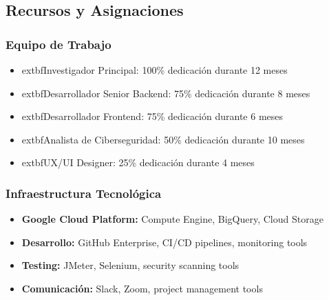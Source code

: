 \subsection{Recursos y Asignaciones}

\subsubsection{Equipo de Trabajo}

\begin{itemize}
    \item 	extbf{Investigador Principal:} 100\% dedicación durante 12 meses
    \item 	extbf{Desarrollador Senior Backend:} 75\% dedicación durante 8 meses
    \item 	extbf{Desarrollador Frontend:} 75\% dedicación durante 6 meses
    \item 	extbf{Analista de Ciberseguridad:} 50\% dedicación durante 10 meses
    \item 	extbf{UX/UI Designer:} 25\% dedicación durante 4 meses
\end{itemize}

\subsubsection{Infraestructura Tecnológica}
\begin{itemize}
    \item \textbf{Google Cloud Platform:} Compute Engine, BigQuery, Cloud Storage
    \item \textbf{Desarrollo:} GitHub Enterprise, CI/CD pipelines, monitoring tools
    \item \textbf{Testing:} JMeter, Selenium, security scanning tools
    \item \textbf{Comunicación:} Slack, Zoom, project management tools
\end{itemize}

